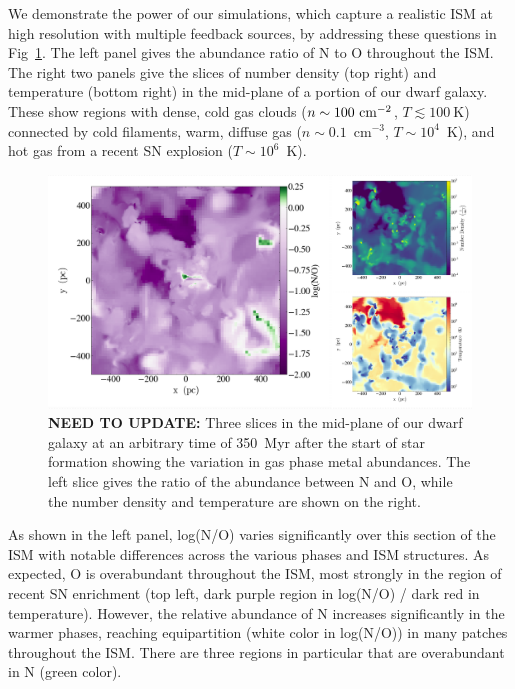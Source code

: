 \documentclass[fleqn,usenatbib,useAMS]{mnras}
\begin{document}
We demonstrate the power of our simulations, which capture a realistic ISM at high resolution with multiple feedback sources, by addressing these questions in Fig~\ref{fig:metal_slices}. The left panel gives the abundance ratio of N to O throughout the ISM. The right 
two panels give the slices of number density (top right) and temperature (bottom right) in the mid-plane of a portion of our dwarf galaxy. These show regions with dense, cold gas clouds ($n \sim 100~\rm{cm}^{-2}$, $T \lesssim 100~$K) connected by cold filaments, warm, diffuse gas ($n\sim 0.1$~cm$^{-3}$, $T\sim 10^{4}$~K), and hot gas from a recent SN explosion ($T\sim10^{6}$~K). 


\begin{figure}
\includegraphics[width=0.98\linewidth]{log_NO_panel}
            \caption{\textbf{NEED TO UPDATE:} Three slices in the mid-plane of our dwarf galaxy at an arbitrary time of 350~Myr after the start of star formation showing the variation in gas phase metal abundances. The left slice gives the ratio of the abundance between N and O, while the number density and temperature are shown on the right. }
\label{fig:metal_slices}
\end{figure}

As shown in the left panel, log(N/O) varies significantly over this section of the ISM with notable differences across the various phases and ISM structures. As expected, O is overabundant throughout the ISM, most strongly in the region of recent SN enrichment (top left, dark purple region in log(N/O) / dark red in temperature). However, the relative abundance of N increases significantly in the warmer phases, reaching equipartition (white color in log(N/O)) in many patches throughout the ISM. There are three regions in particular that are overabundant in N (green color). 
\end{document}
